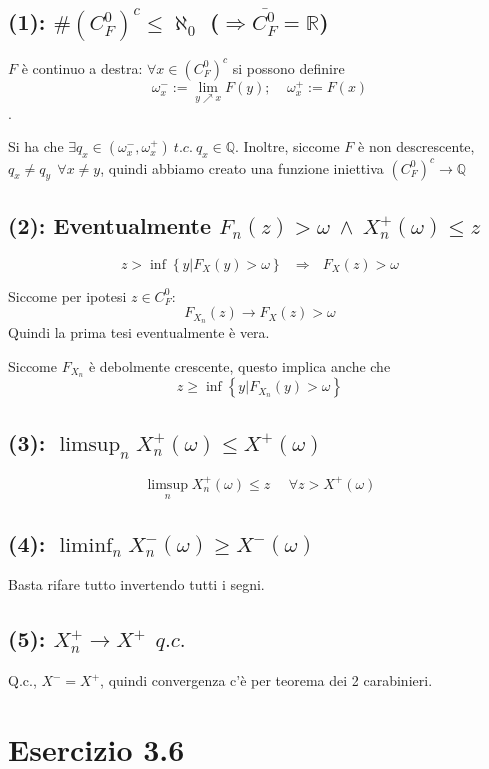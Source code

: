 \documentclass{article}
\begin{document}
\subsection{(1): $\#\left(C_F^0\right)^c \leq  \aleph_0$  ($\Rightarrow \overline{C_F^0} = \mathbb{R}$)}
$F$ è continuo a destra: $\forall x\in (C_F^0)^c$ si possono definire $$\omega_x^- := \lim_{y \nearrow x} F(y); \ \ \ \ \ \omega _x^+ := F(x)$$.

Si ha che $\exists q_x \in  (\omega _x^-, \omega _x^+) \ t.c.\ q_x\in \mathbb{Q}$. Inoltre, siccome $F$ è non descrescente, $q_x \neq  q_y\ \  \forall x\neq y$, quindi abbiamo creato una funzione iniettiva $(C_F^0)^c \longrightarrow \mathbb{Q}$

\subsection{(2): Eventualmente $F_n(z)>\omega \ \land \ X_n^+(\omega )\leq z$}
\[
	z > \inf\left\{y | F_X(y) > \omega \right\} \ \ \ \Longrightarrow \ \ \ F_X(z) > \omega 
\]

Siccome per ipotesi $z \in  C_F^0$:
\[
	F_{X_n} \left(z\right) \longrightarrow  F_X(z) > \omega 
\]
Quindi la prima tesi eventualmente è vera.

Siccome $F_{X_n}$ è debolmente crescente, questo implica anche che
\[
	z \geq  \inf\left\{y | F_{X_n}(y) > \omega \right\}
\]

\subsection{(3): $\limsup_n X_n^+(\omega ) \leq  X^+(\omega )$}
\[
	\limsup_n X_n^+(\omega ) \leq z\ \ \ \ \ \ \forall  z> X^+(\omega )
\]

\subsection{(4): $\liminf_n X_n^-(\omega ) \geq  X^-(\omega )$}
Basta rifare tutto invertendo tutti i segni.

\subsection{(5): $X_n^+ \rightarrow  X^+ \ \ q.c.$}
Q.c., $X^- = X^+$, quindi convergenza c'è per teorema dei 2 carabinieri.


\section{Esercizio 3.6}
\end{document}
